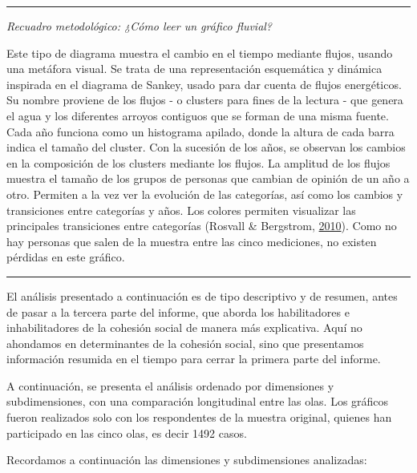 \documentclass[
  12pt,
]{book}
\begin{document}
\begin{center}\rule{0.5\linewidth}{0.5pt}\end{center}

\emph{Recuadro metodológico: ¿Cómo leer un gráfico fluvial?}

Este tipo de diagrama muestra el cambio en el tiempo mediante flujos, usando una metáfora visual. Se trata de una representación esquemática y dinámica inspirada en el diagrama de Sankey, usado para dar cuenta de flujos energéticos. Su nombre proviene de los flujos - o clusters para fines de la lectura - que genera el agua y los diferentes arroyos contiguos que se forman de una misma fuente. Cada año funciona como un histograma apilado, donde la altura de cada barra indica el tamaño del cluster. Con la sucesión de los años, se observan los cambios en la composición de los clusters mediante los flujos. La amplitud de los flujos muestra el tamaño de los grupos de personas que cambian de opinión de un año a otro. Permiten a la vez ver la evolución de las categorías, así como los cambios y transiciones entre categorías y años. Los colores permiten visualizar las principales transiciones entre categorías (Rosvall \& Bergstrom, \protect\hyperlink{ref-rosvall_mapping_2010}{2010}). Como no hay personas que salen de la muestra entre las cinco mediciones, no existen pérdidas en este gráfico.

\begin{center}\rule{0.5\linewidth}{0.5pt}\end{center}

El análisis presentado a continuación es de tipo descriptivo y de resumen, antes de pasar a la tercera parte del informe, que aborda los habilitadores e inhabilitadores de la cohesión social de manera más explicativa. Aquí no ahondamos en determinantes de la cohesión social, sino que presentamos información resumida en el tiempo para cerrar la primera parte del informe.

A continuación, se presenta el análisis ordenado por dimensiones y subdimensiones, con una comparación longitudinal entre las olas. Los gráficos fueron realizados solo con los respondentes de la muestra original, quienes han participado en las cinco olas, es decir 1492 casos.

Recordamos a continuación las dimensiones y subdimensiones analizadas:
\end{document}
